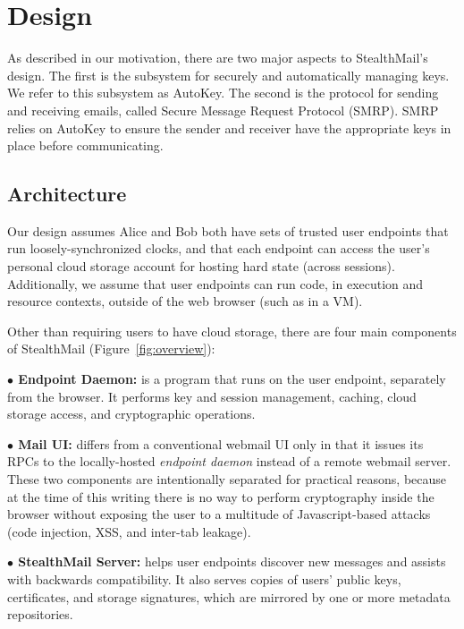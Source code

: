 \section{Design}
\label{sec:design}

As described in our motivation, there are two major aspects to StealthMail’s design.  The first is the subsystem for securely and automatically managing keys.  We refer to this subsystem as AutoKey.  The second is the protocol for sending and receiving emails, called Secure Message Request Protocol (SMRP).  SMRP relies on AutoKey to ensure the sender and receiver have the appropriate keys in place before communicating.

\subsection{Architecture}
Our design assumes Alice and Bob both have sets of trusted user endpoints that run loosely-synchronized clocks, and that each endpoint can access the user's personal cloud storage account for hosting hard state (across sessions).  Additionally, we assume that user endpoints can run code, in execution and resource contexts, outside of the web browser (such as in a VM).

Other than requiring users to have cloud storage, there are four main components of StealthMail (Figure~\ref{fig:overview}):\vspace{0.5em}

{\bf $\bullet$ Endpoint Daemon:} is a program that runs on the user endpoint, separately from the browser.  It performs key and session management, caching, cloud storage access, and cryptographic operations.\vspace{0.5em}

{\bf $\bullet$ Mail UI:} differs from a conventional webmail UI only in that it issues its RPCs to the locally-hosted \emph{endpoint daemon} instead of a remote webmail server. These two components are intentionally separated for practical reasons, because at the time of this writing there is no way to perform cryptography inside the browser without exposing the user to a multitude of Javascript-based attacks (code injection, XSS, and inter-tab leakage).\vspace{0.5em}

{\bf $\bullet$ StealthMail Server:} helps user endpoints discover new messages and assists with backwards compatibility.  It also serves copies of users' public keys, certificates, and storage signatures, which are mirrored by one or more metadata repositories.\vspace{0.5em}

